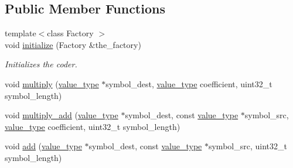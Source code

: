 \subsection*{Public Member Functions}
\begin{DoxyCompactItemize}
\item 
{\footnotesize template$<$class Factory $>$ }\\void \hyperlink{classkodo_1_1finite__field__counter_ad17c9d0b71f8aa42853209f634d9c25c}{initialize} (Factory \&the\-\_\-factory)
\begin{DoxyCompactList}\small\item\em Initializes the coder. \end{DoxyCompactList}\item 
void \hyperlink{classkodo_1_1finite__field__counter_a0bd35f6d2da3e1687f4fa5398ac4adc9}{multiply} (\hyperlink{classkodo_1_1finite__field__counter_a155bca81853a6feeed7e98a3207bbfe6}{value\-\_\-type} $\ast$symbol\-\_\-dest, \hyperlink{classkodo_1_1finite__field__counter_a155bca81853a6feeed7e98a3207bbfe6}{value\-\_\-type} coefficient, uint32\-\_\-t symbol\-\_\-length)
\begin{DoxyCompactList}\small\item\em \end{DoxyCompactList}\item 
void \hyperlink{classkodo_1_1finite__field__counter_a7e25aeb99fae94f10205b6dc7b83516e}{multiply\-\_\-add} (\hyperlink{classkodo_1_1finite__field__counter_a155bca81853a6feeed7e98a3207bbfe6}{value\-\_\-type} $\ast$symbol\-\_\-dest, const \hyperlink{classkodo_1_1finite__field__counter_a155bca81853a6feeed7e98a3207bbfe6}{value\-\_\-type} $\ast$symbol\-\_\-src, \hyperlink{classkodo_1_1finite__field__counter_a155bca81853a6feeed7e98a3207bbfe6}{value\-\_\-type} coefficient, uint32\-\_\-t symbol\-\_\-length)
\begin{DoxyCompactList}\small\item\em \end{DoxyCompactList}\item 
void \hyperlink{classkodo_1_1finite__field__counter_a570bf0f22e83189fb332cfac10f39be5}{add} (\hyperlink{classkodo_1_1finite__field__counter_a155bca81853a6feeed7e98a3207bbfe6}{value\-\_\-type} $\ast$symbol\-\_\-dest, const \hyperlink{classkodo_1_1finite__field__counter_a155bca81853a6feeed7e98a3207bbfe6}{value\-\_\-type} $\ast$symbol\-\_\-src, uint32\-\_\-t symbol\-\_\-length)
\begin{DoxyCompactList}\small\item\em \end{DoxyCompactList}\item 

\end{DoxyCompactItemize}
